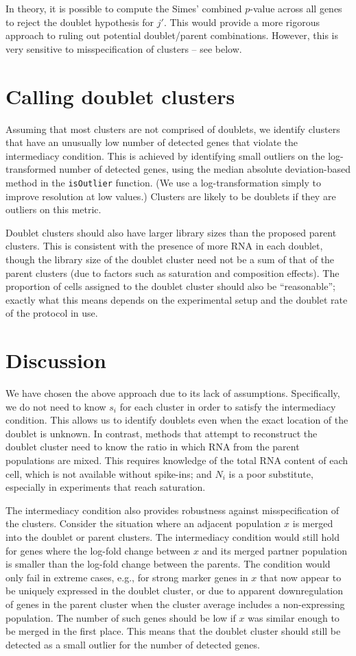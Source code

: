 \documentclass{article}
\begin{document}
In theory, it is possible to compute the Simes' combined $p$-value across all genes to reject the doublet hypothesis for $j'$.
This would provide a more rigorous approach to ruling out potential doublet/parent combinations.
However, this is very sensitive to misspecification of clusters -- see below.

\section{Calling doublet clusters}
Assuming that most clusters are not comprised of doublets, we identify clusters that have an unusually low number of detected genes that violate the intermediacy condition.
This is achieved by identifying small outliers on the log-transformed number of detected genes, using the median absolute deviation-based method in the \texttt{isOutlier} function.
(We use a log-transformation simply to improve resolution at low values.)
Clusters are likely to be doublets if they are outliers on this metric. 

Doublet clusters should also have larger library sizes than the proposed parent clusters.
This is consistent with the presence of more RNA in each doublet, though the library size of the doublet cluster need not be a sum of that of the parent clusters
(due to factors such as saturation and composition effects).
The proportion of cells assigned to the doublet cluster should also be ``reasonable'';
exactly what this means depends on the experimental setup and the doublet rate of the protocol in use.

\section{Discussion}
We have chosen the above approach due to its lack of assumptions.
Specifically, we do not need to know $s_i$ for each cluster in order to satisfy the intermediacy condition.
This allows us to identify doublets even when the exact location of the doublet is unknown.
In contrast, methods that attempt to reconstruct the doublet cluster need to know the ratio in which RNA from the parent populations are mixed.
This requires knowledge of the total RNA content of each cell, which is not available without spike-ins;
and $N_i$ is a poor substitute, especially in experiments that reach saturation.

The intermediacy condition also provides robustness against misspecification of the clusters.
Consider the situation where an adjacent population $x$ is merged into the doublet or parent clusters.
The intermediacy condition would still hold for genes where the log-fold change between $x$ and its merged partner population is smaller than the log-fold change between the parents.
The condition would only fail in extreme cases, e.g., for strong marker genes in $x$ that now appear to be uniquely expressed in the doublet cluster,
or due to apparent downregulation of genes in the parent cluster when the cluster average includes a non-expressing population.
The number of such genes should be low if $x$ was similar enough to be merged in the first place.
This means that the doublet cluster should still be detected as a small outlier for the number of detected genes.
\end{document}
